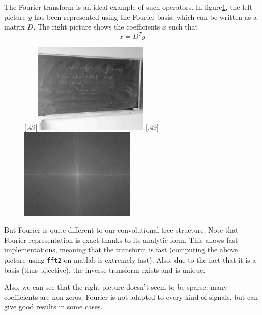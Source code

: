 The Fourier transform is an ideal example of such operators. In figure\ref{exple_fourier}, the left picture $y$ has been represented using the Fourier basis, which can be written as a matrix $D$. The right picture shows the coefficients $x$ such that
$$x = D^Ty$$
\begin{figure}  \label{exple_fourier}
%
  [.49\linewidth]{\includegraphics[width=0.49\textwidth]{figures/exple_fourier_spacial.jpg}}
  [.49\linewidth]{\includegraphics[width=0.49\textwidth]{figures/exple_fourier_frequen.jpg}}
\end{figure}
But Fourier is quite different to our convolutional tree structure. Note that Fourier representation is exact thanks to its analytic form. This allows fast implementations, meaning that the transform is fast (computing the above picture using \texttt{fft2} on matlab is extremely fast). Also, due to the fact that it is a basis (thus bijective), the inverse transform exists and is unique. %

Also, we can see that the right picture doesn't seem to be sparse: many coefficients are non-zeros. Fourier is not adapted to every kind of signals, but can give good results in some cases.

